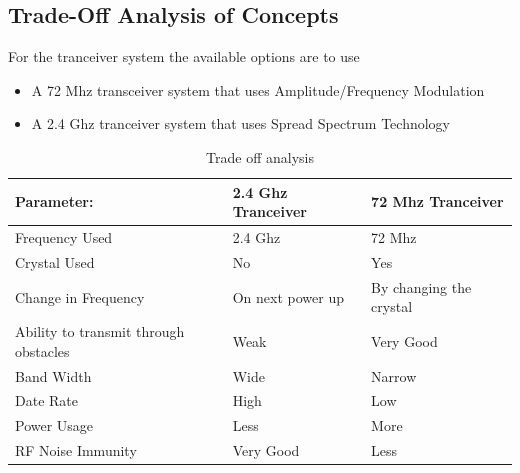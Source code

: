 



\subsection{Trade-Off Analysis of Concepts}

For the tranceiver system the available options are to use
\begin{itemize}
\item A 72 Mhz transceiver system that uses Amplitude/Frequency Modulation
\item A 2.4 Ghz tranceiver system that uses Spread Spectrum Technology
\end{itemize}

\begin{center}
\begin{table}[bht]
\begin{tabular}{||l l l||}
\hline\hline
\textbf{Parameter:} &  \textbf{2.4 Ghz Tranceiver} & \textbf{72 Mhz Tranceiver}\\ 
\hline
Frequency Used & 2.4 Ghz & 72 Mhz \\
Crystal Used & No & Yes \\
Change in Frequency & On next power up & By changing the crystal \\
Ability to transmit through obstacles & Weak & Very Good\\
Band Width & Wide & Narrow\\
Date Rate & High & Low\\
Power Usage & Less & More\\
RF Noise Immunity & Very Good & Less \\
\hline
\end{tabular}
\caption{Trade off analysis}
\label{tab:TradeOff}
\end{table}
\end{center}

